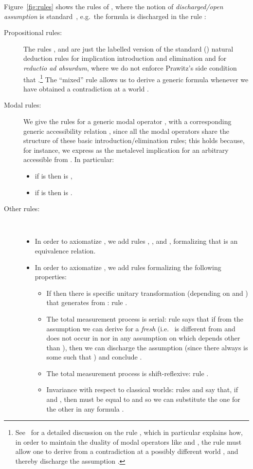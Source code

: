 \documentclass[times, 10pt]{article}
\begin{document}
Figure~\ref{fig:rules} shows the rules of , where the notion of \emph{discharged/open assumption} is standard~\cite{Prawitz65,TroelstraSchwichtenberg96}, e.g.~the formula  is 
discharged in the rule :
\begin{description}
\item[Propositional rules:] The rules ,  and  are just the labelled version of the standard (\cite{Prawitz65,TroelstraSchwichtenberg96}) natural deduction rules for implication introduction and elimination and for 
  \emph{reductio ad absurdum}, where we do not enforce Prawitz's side
  condition that .\footnote{See~\cite{Vigano00a} for a
    detailed discussion on the rule , which in particular
    explains how, in order to maintain the duality of modal operators
    like  and , the rule must allow one to derive
     from a contradiction  at a possibly different world
    , and thereby discharge the assumption .} The
  ``mixed'' rule  allows us to derive a generic formula
   whenever we have obtained a contradiction  at a world
  .
\item[Modal rules:] We give the rules for a generic modal operator , with a corresponding generic accessibility relation , since all the modal operators share the structure of these basic introduction/elimination rules; this holds because, for instance, we express  as the metalevel 
implication  for an arbitrary  accessible from . In particular:
\begin{itemize}
\item if   is  then  is ,
\item if  is  then  is .
\end{itemize}
\item[Other rules:] \
\begin{itemize} 
\item In order to axiomatize , 
we add rules , , and , formalizing that  is an equivalence relation.
\item 
In order to axiomatize , 
we add rules formalizing the following properties:
\begin{itemize}
\item If  then there is specific unitary transformation
  (depending on  and ) that generates  from : rule .
\item The total measurement process is serial: rule  says that if from the assumption  we can derive  for a \emph{fresh}  (i.e.~ is different from  and does not occur in  nor in any assumption on which  depends other than ), then we can discharge the assumption (since there always is some  such that ) and conclude .
\item The total measurement process is shift-reflexive: rule .
\item Invariance with respect to classical worlds: rules  and  say that, if 
 and , then  must be equal to  and so we can substitute the one for the other in any formula .
\end{itemize}
\end{itemize}
\end{description}
\end{document}
